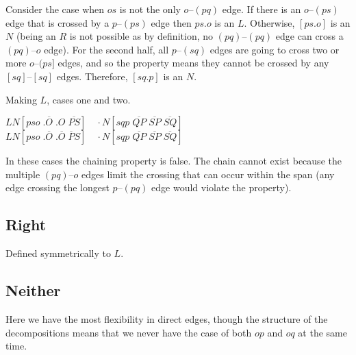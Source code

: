 Consider the case when $os$ is not the only $o$--$(pq)$ edge.
If there is an $o$--$(ps)$ edge that is crossed by a $p$--$(ps)$ edge then $ps.o$ is an $L$.
Otherwise, $[ps.o]$ is an $N$ (being an $R$ is not possible as by definition, no $(pq)$--$(pq)$ edge can cross a $(pq)$--$o$ edge).
For the second half, all $p$--$(sq)$ edges are going to cross two or more $o$--$(ps]$ edges, and so the \oneEC property means they cannot be crossed by any $[sq]$--$[sq]$ edges.
Therefore, $[sq.p]$ is an $N$.

\begin{finalEquation}
\caption{Making $L$, cases one and two.}
  $LN[pso \; .\overline{O} \; .O \; \overline{PS}] \quad \cdotp N[sqp \; \overline{QP} \; \overline{SP} \; \overline{SQ}]$ \\
  $LN[pso \; .\overline{O} \; .\overline{O} \; \overline{P}S] \quad \cdotp N[sqp \; \overline{QP} \; \overline{SP} \; \overline{SQ}]$
\end{finalEquation}

In these cases the chaining property is false.
The chain cannot exist because the multiple $(pq)$--$o$ edges limit the crossing that can occur within the span (any edge crossing the longest $p$--$(pq)$ edge would violate the \oneEC property).

\subsection{Right}
Defined symmetrically to $L$.

\subsection{Neither}
Here we have the most flexibility in direct edges, though the structure of the decompositions means that we never have the case of both $op$ and $oq$ at the same time.

\begin{center}
\\
\end{center}

